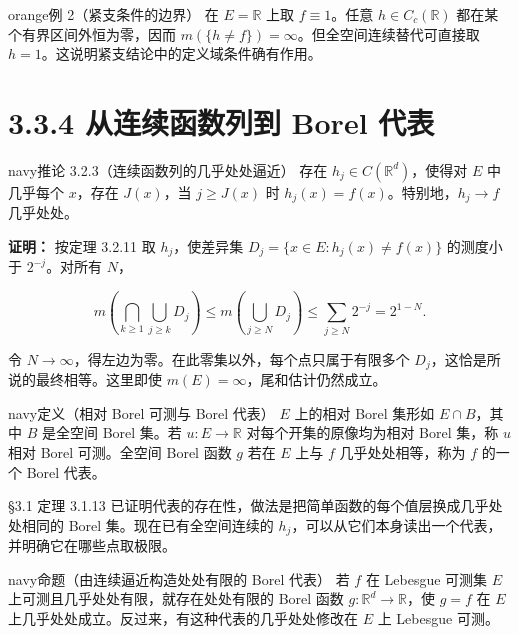 \documentclass[11pt,a4paper]{article}
\begin{document}
\begin{sboxenv}{orange}{例 2（紧支条件的边界）}
在 \(E=\mathbb R\) 上取 \(f\equiv1\)。任意 \(h\in C_c(\mathbb R)\)
都在某个有界区间外恒为零，因而
\(m(\{h\ne f\})=\infty\)。但全空间连续替代可直接取
\(h=1\)。这说明紧支结论中的定义域条件确有作用。

\end{sboxenv}

\clearpage\section[\S{}3.3.4 从连续函数列到 Borel
代表]{3.3.4 从连续函数列到 Borel
代表}\label{ux4eceux8fdeux7eedux51fdux6570ux5217ux5230-borel-ux4ee3ux8868}

\begin{sboxenv}{navy}{推论 3.2.3（连续函数列的几乎处处逼近）}
存在 \(h_j\in C(\mathbb R^d)\)，使得对 \(E\) 中几乎每个 \(x\)，存在
\(J(x)\)，当 \(j\ge J(x)\) 时 \(h_j(x)=f(x)\)。特别地，\(h_j\to f\)
几乎处处。

\end{sboxenv}

\textbf{证明：} 按定理 3.2.11 取 \(h_j\)，使差异集
\(D_j=\{x\in E:h_j(x)\ne f(x)\}\) 的测度小于 \(2^{-j}\)。对所有 \(N\)，

\begin{equation*}
m\!\left(\bigcap_{k\ge1}\bigcup_{j\ge k}D_j\right)
\le m\!\left(\bigcup_{j\ge N}D_j\right)
\le\sum_{j\ge N}2^{-j}=2^{1-N}.
\tag{3.3.3}
\end{equation*}

令 \(N\to\infty\)，得左边为零。在此零集以外，每个点只属于有限多个
\(D_j\)，这恰是所说的最终相等。这里即使
\(m(E)=\infty\)，尾和估计仍然成立。

\begin{sboxenv}{navy}{定义（相对 Borel 可测与 Borel 代表）}
\(E\) 上的相对 Borel 集形如 \(E\cap B\)，其中 \(B\) 是全空间 Borel
集。若 \(u:E\to\mathbb R\) 对每个开集的原像均为相对 Borel 集，称 \(u\)
相对 Borel 可测。全空间 Borel 函数 \(g\) 若在 \(E\) 上与 \(f\)
几乎处处相等，称为 \(f\) 的一个 Borel 代表。

\end{sboxenv}

§3.1 定理 3.1.13
已证明代表的存在性，做法是把简单函数的每个值层换成几乎处处相同的 Borel
集。现在已有全空间连续的
\(h_j\)，可以从它们本身读出一个代表，并明确它在哪些点取极限。

\begin{sboxenv}{navy}{命题（由连续逼近构造处处有限的 Borel 代表）}
若 \(f\) 在 Lebesgue 可测集 \(E\) 上可测且几乎处处有限，就存在处处有限的
Borel 函数 \(g:\mathbb R^d\to\mathbb R\)，使 \(g=f\) 在 \(E\)
上几乎处处成立。反过来，有这种代表的几乎处处修改在 \(E\) 上 Lebesgue
可测。

\end{sboxenv}
\end{document}
